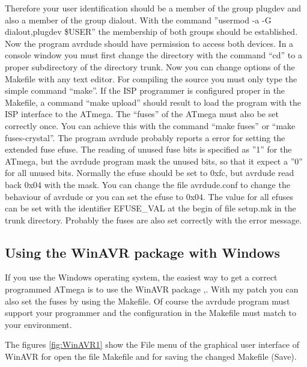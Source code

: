 Therefore your user identification should be a member of the group plugdev and also
a member of the group dialout.
With the command ''usermod -a -G dialout,plugdev \$USER'' the membership of both groups should be established.
Now the program avrdude should have permission to access both devices.
In a console window you must first change the directory with the command ``cd'' to a proper
subdirectory of the directory trunk.
Now you can change options of the Makefile with any text editor.
For compiling the source you must only type the simple command ``make''.
If the ISP programmer is configured proper in the Makefile, a command ``make upload''
should result to load the program with the ISP interface to the ATmega.
The ``fuses'' of the ATmega must also be set correctly once.
You can achieve this with the command ``make fuses'' or ``make fuses-crystal''.
The program avrdude probably reports a error for setting the extended fuse efuse.
The reading of unused fuse bits is specified as ''1'' for the ATmega, but the
avrdude program mask the unused bits, so that it expect a ''0'' for all unused bits.
Normally the efuse should be set to 0xfc, but avrdude read back 0x04 with the mask.
You can change the file avrdude.conf to change the behaviour of avrdude or
you can set the efuse to 0x04. 
The value for all efuses can be set with the identifier EFUSE\_VAL at the begin of file setup.mk
in the trunk directory.
Probably the fuses are also set correctly with the error message.

\subsection{Using the WinAVR package with Windows}
If you use the Windows operating system, the easiest way to get a correct programmed
ATmega is to use the WinAVR package \cite{winavr1},\cite{winavr2}.
With my patch \cite{winavr3} you can also set the fuses by using the Makefile.
Of course the avrdude program must support your programmer and the configuration
in the Makefile must match to your environment.

The figures \ref{fig:WinAVR1} show the File menu of the graphical user interface of WinAVR for
open the file Makefile and for saving the changed Makefile (Save).

